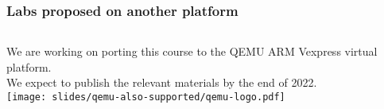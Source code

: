 \begin{frame}
\frametitle{Labs proposed on another platform}
  \begin{columns}
    We are working on porting this course to the QEMU ARM Vexpress virtual platform.\\
    \vspace{1em}
    We expect to publish the relevant materials by the end of 2022.\\
    \texttt{[image: slides/qemu-also-supported/qemu-logo.pdf]}
  \end{columns}
  \vspace{1cm}
\end{frame}
